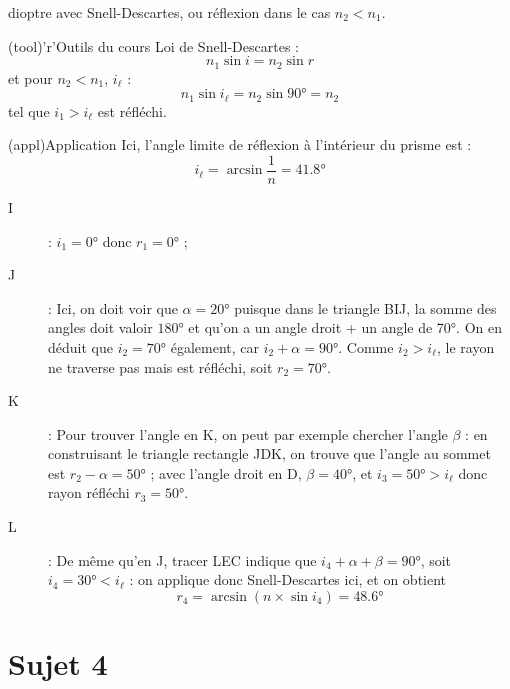 \documentclass[a4paper, 11pt]{book}
\begin{document}
{\begin{tcbraster}[raster columns=3, raster equal height=rows]
\begin{tcolorbox}[blankest, raster multicolumn=1, space to=\myspace]
\begin{tcbraster}[raster columns=1]
\begin{tcb}[]
					dioptre avec Snell-Descartes, ou réflexion dans le cas $n_2 <
						n_1$.
				\end{tcb}
				\begin{tcb}(tool)'r'{Outils du cours}
					Loi de Snell-Descartes :
					\[ n_1\sin i = n_2\sin r\]
					et pour $n_2 < n_1$, $i_\ell$ :
					\[ n_1\sin i_\ell = n_2\sin \ang{90;;} = n_2\]
					tel que $i_1 > i_\ell$ est réfléchi.
				\end{tcb}
			\end{tcbraster}
		\end{tcolorbox}
	\end{tcbraster}
	\begin{tcb}[sidebyside](appl){Application}
		Ici, l'angle limite de réflexion à l'intérieur du prisme est : \[i_\ell =
			\arcsin \frac{1}{n} = \boxed{ \ang{41.8;;}}\]
		\begin{description}
			\item[I] : $\boxed{i_1 = \ang{0;;}}$ donc
				$\boxed{r_1 = \ang{0;;}}$ ;
			\item[J] : Ici, on doit voir que $\alpha = \ang{20;;}$ puisque
				dans le triangle BIJ, la somme des angles doit valoir $\ang{180;;}$
				et qu'on a un angle droit + un angle de \ang{70;;}.
				On en déduit que $\boxed{i_2 = \ang{70;;}}$ également, car
				$i_2 + \alpha = \ang{90;;}$.\smallbreak
				Comme \underline{$i_2 > i_\ell$}, le rayon ne traverse pas mais est
				réfléchi, soit $\boxed{r_2 = \ang{70;;}}$.
		\end{description}
		\tcblower
		\begin{description}
			\item[K] : Pour trouver l'angle en K, on peut par exemple chercher
				l'angle $\beta$ : en construisant le triangle rectangle JDK, on
				trouve que l'angle au sommet est $r_2 - \alpha = \ang{50;;}$ ;
				avec l'angle droit en D, $\beta = \ang{40;;}$, et $\boxed{i_3
						= \ang{50;;} > i_\ell}$ donc rayon réfléchi $\boxed{r_3 =
						\ang{50;;}}$.
			\item[L] : De même qu'en J, tracer LEC indique que $i_4 + \alpha + \beta
					= \ang{90;;}$, soit $\boxed{i_4 = \ang{30;;} < i_\ell}$
				: on applique donc Snell-Descartes ici, et on obtient
				\[\boxed{r_4} = \arcsin (n\times \sin i_4) =
					\boxed{\ang{48.6;;}}\]
		\end{description}
	\end{tcb}

}

\newpage

\chapter{Sujet 4}
\end{document}
